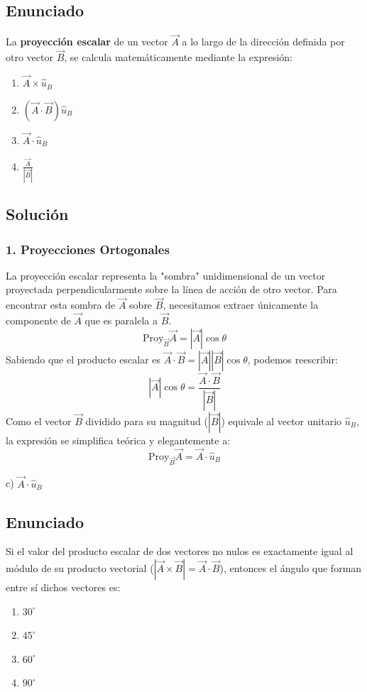 \documentclass[12pt, a4paper]{article}
\begin{document}
\subsection*{Enunciado}
La \textbf{proyección escalar} de un vector $\vec{A}$ a lo largo de la dirección definida por otro vector $\vec{B}$, se calcula matemáticamente mediante la expresión:
\begin{enumerate}[label=\alph*)]
    \item $\vec{A} \times \hat{u}_B$
    \item $(\vec{A} \cdot \vec{B}) \hat{u}_B$
    \item $\vec{A} \cdot \hat{u}_B$
    \item $\frac{\vec{A}}{|\vec{B}|}$
\end{enumerate}

\subsection*{Solución}

\subsubsection*{1. Proyecciones Ortogonales}
La proyección escalar representa la "sombra" unidimensional de un vector proyectada perpendicularmente sobre la línea de acción de otro vector.
Para encontrar esta sombra de $\vec{A}$ sobre $\vec{B}$, necesitamos extraer únicamente la componente de $\vec{A}$ que es paralela a $\vec{B}$.
$$ \text{Proy}_{\vec{B}} \vec{A} = |\vec{A}| \cos\theta $$
Sabiendo que el producto escalar es $\vec{A} \cdot \vec{B} = |\vec{A}||\vec{B}|\cos\theta$, podemos reescribir:
$$ |\vec{A}|\cos\theta = \frac{\vec{A} \cdot \vec{B}}{|\vec{B}|} $$
Como el vector $\vec{B}$ dividido para su magnitud ($|\vec{B}|$) equivale al vector unitario $\hat{u}_B$, la expresión se simplifica teórica y elegantemente a:
$$ \text{Proy}_{\vec{B}} \vec{A} = \vec{A} \cdot \hat{u}_B $$

\begin{tcolorbox}[colback=green!5!white, colframe=green!50!black, title=Respuesta Final]
\centering \Large c) $\vec{A} \cdot \hat{u}_B$
\end{tcolorbox}

\newpage


\subsection*{Enunciado}
Si el valor del producto escalar de dos vectores no nulos es exactamente igual al módulo de su producto vectorial ($|\vec{A} \times \vec{B}| = \vec{A} \cdot \vec{B}$), entonces el ángulo que forman entre sí dichos vectores es:
\begin{enumerate}[label=\alph*)]
    \item $30^\circ$
    \item $45^\circ$
    \item $60^\circ$
    \item $90^\circ$
\end{enumerate}
\end{document}
